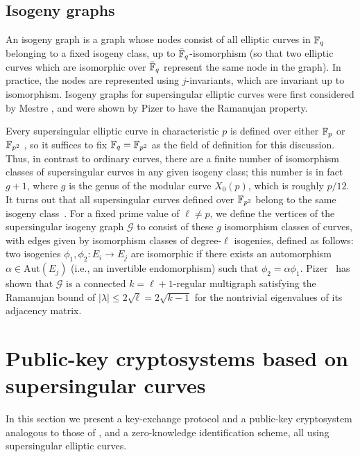 \subsection{Isogeny graphs}\label{isog_graph} 

An isogeny graph is a graph whose nodes consist of all elliptic curves
in ${\mathbb{F}}_q$ belonging to a fixed isogeny class, up to
$\bar{{\mathbb{F}}}_q$-isomorphism (so that two elliptic curves which are
isomorphic over $\bar{{\mathbb{F}}}_q$ represent the same node in the
graph). In practice, the nodes are represented using $j$-invariants,
which are invariant up to isomorphism. 
Isogeny graphs for supersingular elliptic curves were first considered
by Mestre \cite{mestre86}, and were shown by Pizer \cite{pizer1,pizer2}
to have the Ramanujan property.

Every supersingular elliptic curve in characteristic $p$ is defined
over either ${\mathbb{F}}_p$ or ${\mathbb{F}}_{p^2}$ \cite{Sil}, so it suffices to fix
${\mathbb{F}}_q = {\mathbb{F}}_{p^2}$ as the field of definition for this
discussion. Thus, in contrast to ordinary curves, there are a finite
number of isomorphism classes of supersingular curves in any given isogeny class;
this number is in fact $g+1$, where $g$ is the genus of the modular curve $X_0(p)$,
which is roughly $p/12$. It turns out that all supersingular
curves defined over ${\mathbb{F}}_{p^2}$ belong to the same isogeny
class~\cite{mestre86}. For a fixed prime value of $\ell \neq p$, we
define the vertices of the supersingular isogeny graph $\mathcal{G}$
to consist of these $g$ isomorphism classes of curves, with
edges given by isomorphism classes of degree-$\ell$ isogenies,
defined as follows: two isogenies $\phi_1, \phi_2 \colon E_i \to E_j$
are isomorphic if there exists an automorphism $\alpha \in
\text{Aut}(E_j)$ (i.e., an invertible endomorphism) such that $\phi_2
= \alpha\phi_1$. Pizer~\cite{pizer1,pizer2} has shown that
$\mathcal{G}$ is a connected $k = \ell + 1$-regular multigraph
satisfying the Ramanujan bound of $|\lambda| \leq 2\sqrt{\ell} =
2\sqrt{k - 1}$ for the nontrivial eigenvalues of its adjacency matrix.


\section{Public-key cryptosystems based on supersingular curves}\label{sec:kep}

In this section we present a key-exchange protocol and a public-key
cryptosystem analogous to those of \cite{rostovtsev+stolbunov06,Stol}, and a
zero-knowledge identification scheme, all using supersingular elliptic
curves.

